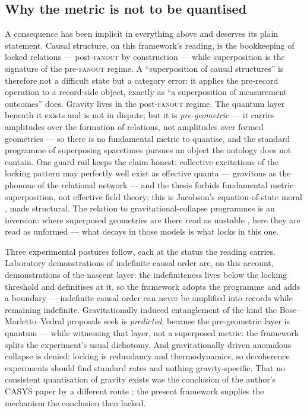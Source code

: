\subsection{Why the metric is not to be quantised}\label{sec:no-quantised-gravity}

A consequence has been implicit in everything above and deserves its plain statement. Causal
structure, on this framework's reading, is the bookkeeping of locked relations --- post-\textsc{fanout}
by construction --- while superposition is the signature of the pre-\textsc{fanout} regime. A
``superposition of causal structures'' is therefore not a difficult state but a category error: it
applies the pre-record operation to a record-side object, exactly as ``a superposition of
measurement outcomes'' does. Gravity lives in the post-\textsc{fanout} regime. The quantum layer
beneath it exists and is not in dispute; but it is \emph{pre-geometric} --- it carries amplitudes
over the formation of relations, not amplitudes over formed geometries --- so there is no
fundamental metric to quantise, and the standard programme of superposing spacetimes pursues an
object the ontology does not contain. One guard rail keeps the claim honest: collective
excitations of the locking pattern may perfectly well exist as effective quanta --- gravitons as
the phonons of the relational network --- and the thesis forbids fundamental metric superposition,
not effective field theory; this is Jacobson's equation-of-state moral \autocite{Jacobson1995},
made structural. The relation to gravitational-collapse programmes is an inversion: where
superposed geometries are there read as unstable \autocite{Penrose1996}, here they are read as
unformed --- what decays in those models is what locks in this one.

Three experimental postures follow, each at the status the reading carries. Laboratory
demonstrations of indefinite causal order \autocite{procopio2015experimental} are, on this
account, demonstrations of the nascent layer: the indefiniteness lives below the locking threshold
and definitises at it, so the framework adopts the programme and adds a boundary --- indefinite
causal order can never be amplified into records while remaining indefinite. Gravitationally
induced entanglement of the kind the Bose--Marletto--Vedral proposals seek
\autocite{bose2017spin, marlettovedral2017gravitationally} is \emph{predicted}, because the
pre-geometric layer is quantum --- while witnessing that layer, not a superposed metric: the
framework splits the experiment's usual dichotomy. And gravitationally driven anomalous collapse
is denied: locking is redundancy and thermodynamics, so decoherence experiments should find
standard rates and nothing gravity-specific. That no consistent quantisation of gravity exists was
the conclusion of the author's CASYS paper by a different route \autocite{small_2006}; the present
framework supplies the mechanism the conclusion then lacked.

